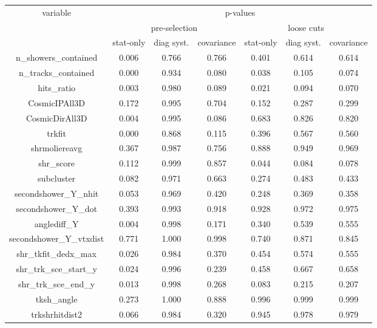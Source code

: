 \begin{table}[H]
\centering
\setlength{\tabcolsep}{10pt}
\renewcommand{\arraystretch}{1.25}
\begin{tabular}{| c | c | c | c | c | c | c | } 
 \hline
\multirow{3}{*}{variable} & \multicolumn{6}{c|}{p-values} \\
\cline{2-7} & \multicolumn{3}{c|}{pre-selection} & \multicolumn{3}{c|}{loose cuts}  \\
\cline{2-7} & stat-only & diag syst. & covariance & stat-only & diag syst. & covariance \\ \hline
n\_showers\_contained & 0.006 & 0.766 & 0.766 & 0.401 & 0.614 & 0.614 \\ \hline
n\_tracks\_contained & 0.000 & 0.934 & 0.080 & 0.038 & 0.105 & 0.074 \\ \hline
hits\_ratio & 0.003 & 0.980 & 0.089 & 0.021 & 0.094 & 0.070 \\ \hline
CosmicIPAll3D & 0.172 & 0.995 & 0.704 & 0.152 & 0.287 & 0.299 \\ \hline
CosmicDirAll3D & 0.004 & 0.995 & 0.086 & 0.683 & 0.826 & 0.820 \\ \hline
trkfit & 0.000 & 0.868 & 0.115 & 0.396 & 0.567 & 0.560 \\ \hline
shrmoliereavg & 0.367 & 0.987 & 0.756 & 0.888 & 0.949 & 0.969 \\ \hline
shr\_score & 0.112 & 0.999 & 0.857 & 0.044 & 0.084 & 0.078 \\ \hline
subcluster & 0.082 & 0.971 & 0.663 & 0.274 & 0.483 & 0.433 \\ \hline
secondshower\_Y\_nhit & 0.053 & 0.969 & 0.420 & 0.248 & 0.369 & 0.358 \\ \hline
secondshower\_Y\_dot & 0.393 & 0.993 & 0.918 & 0.928 & 0.972 & 0.975 \\ \hline
anglediff\_Y & 0.004 & 0.998 & 0.171 & 0.340 & 0.539 & 0.555 \\ \hline
secondshower\_Y\_vtxdist & 0.771 & 1.000 & 0.998 & 0.740 & 0.871 & 0.845 \\ \hline
shr\_tkfit\_dedx\_max & 0.026 & 0.984 & 0.370 & 0.454 & 0.574 & 0.555 \\ \hline
shr\_trk\_sce\_start\_y & 0.024 & 0.996 & 0.239 & 0.458 & 0.667 & 0.658 \\ \hline
shr\_trk\_sce\_end\_y & 0.013 & 0.998 & 0.268 & 0.083 & 0.215 & 0.207 \\ \hline
tksh\_angle & 0.273 & 1.000 & 0.888 & 0.996 & 0.999 & 0.999 \\ \hline
trkshrhitdist2 & 0.066 & 0.984 & 0.320 & 0.945 & 0.978 & 0.979 \\ \hline

\end{tabular}
\end{table}

